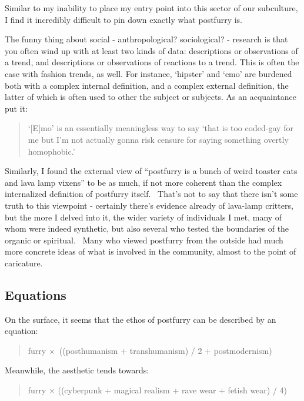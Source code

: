 Similar to my inability to place my entry point into this sector of our
subculture, I find it incredibly difficult to pin down exactly what
postfurry is.

The funny thing about social - anthropological? sociological? - research
is that you often wind up with at least two kinds of data: descriptions
or observations of a trend, and descriptions or observations of
reactions to a trend. This is often the case with fashion trends, as
well. For instance, `hipster' and `emo' are burdened both with a complex
internal definition, and a complex external definition, the latter of
which is often used to other the subject or subjects. As an acquaintance
put it:

\begin{quote}
`{[}E{]}mo' is an essentially meaningless way to say `that is too
coded-gay for me but I'm not actually gonna risk censure for saying
something overtly homophobic.'
\end{quote}

Similarly, I found the external view of ``postfurry is a bunch of weird
toaster cats and lava lamp vixens'' to be as much, if not more coherent
than the complex internalized definition of postfurry itself. ~That's
not to say that there isn't some truth to this viewpoint - certainly
there's evidence already of lava-lamp critters, but the more I delved
into it, the wider variety of individuals I met, many of whom were
indeed synthetic, but also several who tested the boundaries of the
organic or spiritual. ~Many who viewed postfurry from the outside had
much more concrete ideas of what is involved in the community, almost to
the point of caricature.

\subsection{Equations}\label{equations}

On the surface, it seems that the ethos of postfurry can be described by
an equation:

\begin{quote}
furry ×~((posthumanism + transhumanism) / 2 + postmodernism)
\end{quote}

Meanwhile, the aesthetic tends towards:

\begin{quote}
furry × ((cyberpunk + magical realism + rave wear + fetish wear) / 4)
\end{quote}

